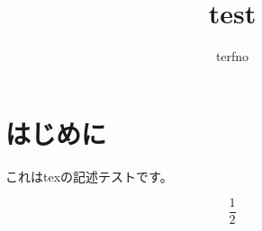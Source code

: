 \documentclass{article}
\begin{document}
  \title{test}
  \author{terfno}
  \maketitle

  \section{はじめに}
  これはtexの記述テストです。

  $$
    \frac{1}{2}
  $$
\end{document}
